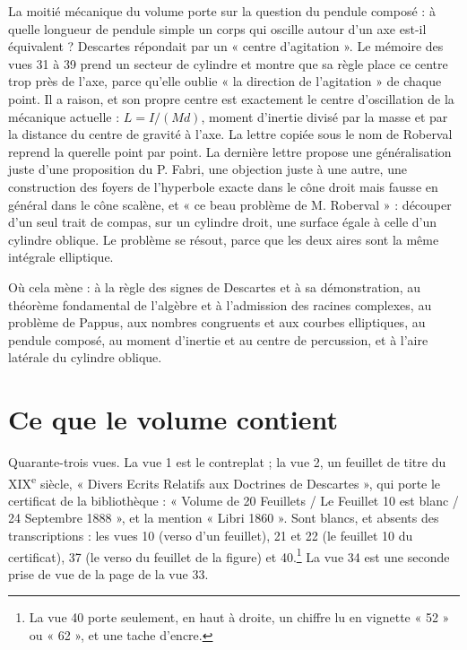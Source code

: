 \documentclass[11pt,a4paper]{article}
\begin{document}
\begin{resume}
La moitié mécanique du volume porte sur la question du pendule composé : à
quelle longueur de pendule simple un corps qui oscille autour d'un
axe est-il équivalent ? Descartes répondait par un « centre d'agitation ». Le
mémoire des vues 31 à 39 prend un secteur de cylindre et montre que sa règle
place ce centre trop près de l'axe, parce qu'elle oublie « la direction de
l'agitation » de chaque point. Il a raison, et son propre centre est exactement
le centre d'oscillation de la mécanique actuelle : \(L = I/(Md)\), moment
d'inertie divisé par la masse et par la distance du centre de gravité à l'axe.
La lettre copiée sous le nom de Roberval reprend la querelle point par point.
La dernière lettre propose une généralisation juste d'une proposition du
P. Fabri, une objection juste à une autre, une construction des foyers de
l'hyperbole exacte dans le cône droit mais fausse en général dans le cône
scalène, et « ce beau problème de M. Roberval » : découper d'un
seul trait de compas, sur un cylindre droit, une surface égale à celle d'un
cylindre oblique. Le problème se résout, parce que les deux aires sont la même
intégrale elliptique.

Où cela mène : à la règle des signes de Descartes et à sa démonstration, au
théorème fondamental de l'algèbre et à l'admission des racines complexes, au
problème de Pappus, aux nombres congruents et aux courbes elliptiques, au
pendule composé, au moment d'inertie et au centre de percussion, et à l'aire
latérale du cylindre oblique.

\end{resume}

\section*{Ce que le volume contient}

Quarante-trois vues. La vue 1 est le contreplat ; la vue 2, un feuillet de
titre du XIX\textsuperscript{e} siècle, « Divers Ecrits Relatifs aux Doctrines
de Descartes », qui porte le certificat de la bibliothèque : « Volume de 20
Feuillets / Le Feuillet 10 est blanc / 24 Septembre 1888 », et la mention
« Libri 1860 ». Sont blancs, et absents des transcriptions : les vues 10
(verso d'un feuillet), 21 et 22 (le feuillet 10 du certificat), 37 (le verso du
feuillet de la figure) et 40.\footnote{La vue 40 porte seulement, en haut à
droite, un chiffre lu en vignette « 52 » ou « 62 », et une tache d'encre.} La vue
34 est une seconde prise de vue de la page de la vue 33.
\end{document}
